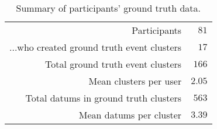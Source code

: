 \begin{table}[htp]
	\begin{center}
	\caption{Summary of participants' ground truth data.}
	\label{tab:ch4_table_gt_summary}
		\begin{tabular}{r r}
		\toprule
			Participants & $81$\\
			...who created ground truth event clusters & $17$\\
			Total ground truth event clusters & $166$\\
			Mean clusters per user & $2.05$\\
			Total datums in ground truth clusters & $563$\\
			Mean datums per cluster & $3.39$\\
		\bottomrule
		\end{tabular}
	\end{center}
\end{table}